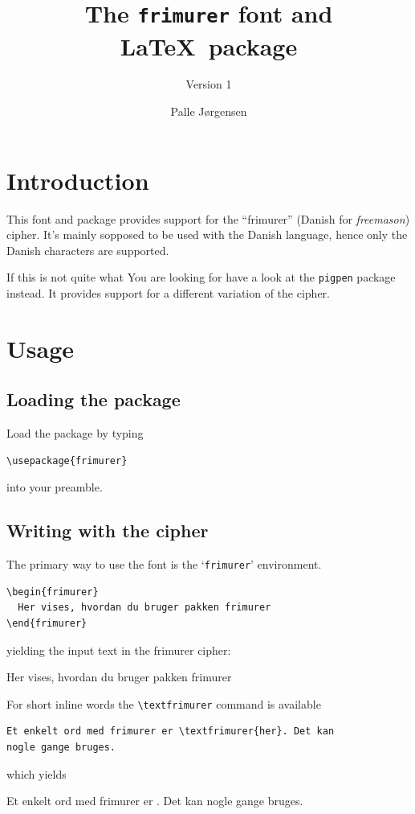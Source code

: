 \documentclass[11pt,parskip=half]{scrartcl}
\title{The \texttt{frimurer} font and \LaTeX\ package\smallskip\\\textfrimurer{frimurer}}
\subtitle{Version 1}
\author{Palle Jørgensen}
\begin{document}
\maketitle

\section{Introduction}
\label{sec:introduction}

This font and package provides support for the ``frimurer'' (Danish
for \emph{freemason}) cipher. It's mainly sopposed to be used with the
Danish language, hence only the Danish characters are supported.

If this is not quite what You are looking for have a look at the
\texttt{pigpen} package instead. It provides support for a different
variation of the cipher.

\section{Usage}
\label{sec:usage}

\subsection{Loading the package}
\label{sec:loading-package}

Load the package by typing
\begin{lstlisting}
\usepackage{frimurer}
\end{lstlisting}
into your preamble.

\subsection{Writing with the cipher}
\label{sec:writing-with-cipher}

The primary way to use the font is the `\lstinline{frimurer}'
environment.
\begin{lstlisting}
\begin{frimurer}
  Her vises, hvordan du bruger pakken frimurer
\end{frimurer}
\end{lstlisting}
yielding the input text in the frimurer cipher:
\begin{frimurer}
  Her vises, hvordan du bruger pakken frimurer
\end{frimurer}
For short inline words the \lstinline{\textfrimurer} command is available
\begin{lstlisting}
Et enkelt ord med frimurer er \textfrimurer{her}. Det kan 
nogle gange bruges.
\end{lstlisting}
which yields\par
\begin{minipage}{1.0\linewidth}
  Et enkelt ord med frimurer er . Det kan nogle
  gange bruges.
\end{minipage}
\end{document}
